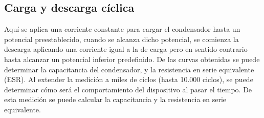 \subsection{Carga y descarga cíclica}
Aquí se aplica una corriente constante para cargar el condensador hasta un potencial preestablecido, cuando se alcanza dicho potencial, se comienza la descarga aplicando una corriente igual a la de carga pero en sentido contrario hasta alcanzar un potencial inferior predefinido. De las curvas obtenidas se puede determinar la capacitancia del condensador, y la resistencia en serie equivalente (ESR). Al extender la medición a miles de ciclos (hasta 10.000 ciclos), se puede determinar cómo será el comportamiento del dispositivo al pasar el tiempo.
De esta medición se puede calcular la capacitancia y la resistencia en serie equivalente.